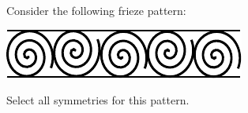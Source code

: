 \documentclass{ximera}
\author{Bart Snapp}
\begin{document}
\begin{exercise}
  Consider the following frieze pattern:
  \begin{image}
  \includegraphics{fph9.pdf}
  \end{image}
  Select all symmetries for this pattern.
  \begin{selectAll}
  \end{selectAll}
\end{exercise}
\end{document}
